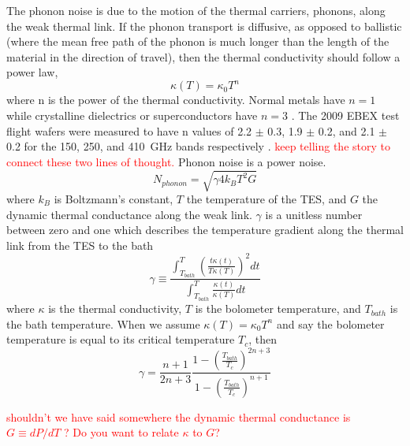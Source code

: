 The phonon noise is due to the motion of the thermal carriers, phonons, along the weak thermal link. 
If the phonon transport is diffusive, as opposed to ballistic (where the mean free path of the phonon is much longer than the length of the material in the direction of travel), then the thermal conductivity should follow a power law, 
\begin{equation}
\kappa \left( T \right) = \kappa_0 T^n
\end{equation}
where n is the power of the thermal conductivity. 
Normal metals have $n=1$ while crystalline dielectrics or superconductors have $n=3$ \cite{Mather1982}. 
The 2009 \ac{EBEX} test flight wafers were measured to have n values of 2.2 $\pm$ 0.3, 1.9 $\pm$ 0.2, and 2.1 $\pm$ 0.2 for the 150, 250, and 410~GHz bands respectively \cite{Hubmayr2009}.
\textcolor{red}{keep telling the story to connect these two lines of thought.}
Phonon noise is a power noise. 
\begin{equation}
N_{phonon} = \sqrt{\gamma 4k_{B} T^2 G}
\label{eq:phonon}
\end{equation}
where $k_{B}$ is Boltzmann's constant, $T$ the temperature of the \ac{TES}, and $G$ the dynamic thermal conductance along the weak link. 
 $\gamma$ is a unitless number between zero and one which describes the temperature gradient along the thermal link from the \ac{TES} to the bath  
\begin{equation}
\gamma \equiv \frac{\int_{T_{bath}}^{T} \left( \frac{t\kappa(t)}{T\kappa(T)}\right)^2 dt}{\int_{T_{bath}}^{T} \frac{\kappa(t)}{\kappa(T)} dt} 
\end{equation}
where $\kappa$ is the thermal conductivity, $T$ is the bolometer temperature, and $T_{bath}$ is the bath temperature. 
When we assume $\kappa(T) = \kappa_0 T^n$ and say the bolometer temperature is equal to its critical temperature $T_c$, then
\begin{equation}
\gamma = \frac{n+1}{2n+3} \frac{1-\left(\frac{T_{bath}}{T_c}\right)^{2n+3}}{1-\left(\frac{T_{bath}}{T_c}\right)^{n+1}}
\label{eq:gamma}
\end{equation}

\textcolor{red}{shouldn't we have said somewhere the dynamic thermal conductance is $G \equiv dP/dT$ ? Do you want to relate $\kappa$ to $G$?}

